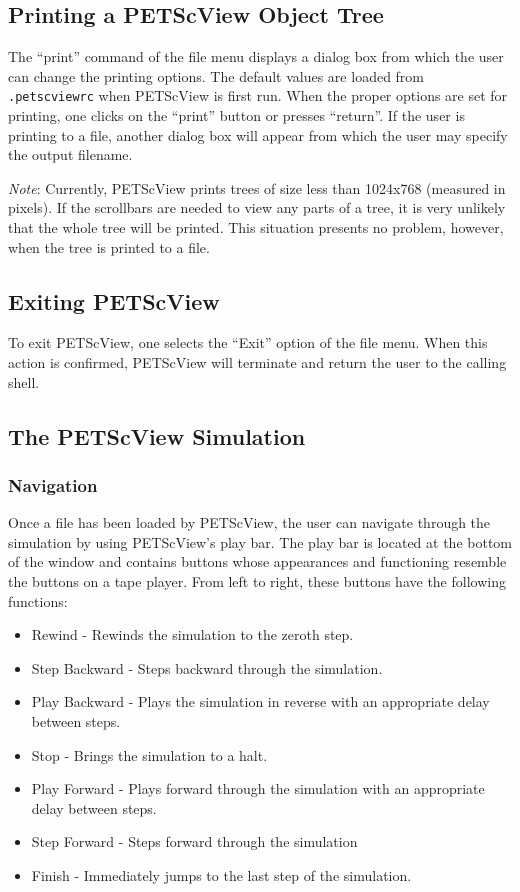 \subsection{Printing a PETScView Object Tree}

The ``print'' command of the file menu displays a dialog box from
which the user can change the printing options.  The default values
are loaded from {\tt .petscviewrc} when PETScView is first run.  When
the proper options are set for printing, one clicks on the ``print''
button or presses ``return''.  If the user is printing to a file,
another dialog box will appear from which the user may specify the
output filename.

{\em Note}:  Currently, PETScView  prints trees of size less
than 1024x768 (measured in pixels).  If the scrollbars are needed to
view any parts of a tree, it is very unlikely that the whole tree will
be printed.  This situation presents no problem, however, when the tree is
printed to a file.

\subsection{Exiting PETScView}

To exit PETScView, one selects the ``Exit'' option of the file
menu.  When this action is confirmed, PETScView will terminate
and return the user to the calling shell.

\subsection{The PETScView Simulation}

\subsubsection{Navigation}

Once a file has been loaded by PETScView, the user can navigate
through the simulation by using PETScView's play bar.  The play
bar is located at the bottom of the window and contains buttons whose
appearances and functioning resemble the buttons on a tape player.
From left to right, these buttons have the following functions:
\begin{itemize}
\item Rewind - Rewinds the simulation to the zeroth step.
\item Step Backward - Steps backward through the simulation.
\item Play Backward - Plays the simulation in reverse with an appropriate delay between steps.  
\item Stop - Brings the simulation to a halt.
\item Play Forward - Plays forward through the simulation with an appropriate delay between steps.
\item Step Forward - Steps forward through the simulation
\item Finish - Immediately jumps to the last step of the simulation.
\end{itemize}

